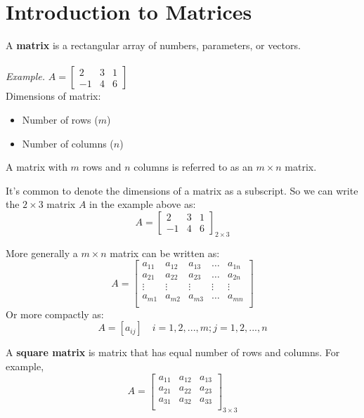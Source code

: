 \documentclass{./../../latex/handout}
\begin{document}
\thispagestyle{plain}
\newcommand{\mytitle}{Linear Algebra}
\myheader{\mytitle}

\section{Introduction to Matrices}
A \textbf{matrix} is a rectangular array of numbers, parameters, or vectors. \\~\\
\textit{Example.} $A = \begin{bmatrix}
2 & 3 & 1 \\
-1 &4 & 6
\end{bmatrix}$ \\

Dimensions of matrix:
\begin{itemize}
\item Number of rows ($m$)
\item Number of columns ($n$)
\end{itemize}
A matrix with $m$ rows and $n$ columns is referred to as an $m \times n$ matrix. 

It's common to denote the dimensions of a matrix as a subscript. So we can write the $ 2 \times 3$ matrix $A$ in the example above as:
  \[A = \begin{bmatrix}
2 & 3 & 1 \\
-1 &4 & 6
\end{bmatrix}_{2 \times 3}\]

More generally a $m \times n$ matrix can be written as:
\[A = \begin{bmatrix}
a_{11} & a_{12} & a_{13} & \hdots & a_{1n} \\
a_{21} & a_{22} & a_{23} & \hdots & a_{2n} \\
\vdots & \vdots & \vdots & \vdots & \vdots \\
a_{m1} & a_{m2} & a_{m3} & \hdots & a_{mn} \\
\end{bmatrix}\]
Or more compactly as:
\[ A = [ a_{ij} ] \quad i=1,2,...,m; j=1,2,...,n\] 

A \textbf{square matrix} is matrix that has equal number of rows and columns. For example,
\[A = \begin{bmatrix}
a_{11} & a_{12} & a_{13} \\
a_{21} & a_{22} & a_{23} \\
a_{31} & a_{32} & a_{33} \\
\end{bmatrix}_{3\times 3}\]
\end{document}
